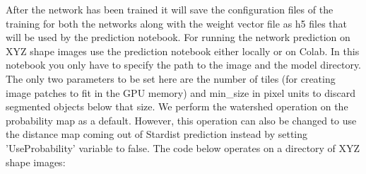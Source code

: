 \documentclass[letterpaper,compsoc,twoside,onecolumn]{IEEEtran}
\begin{document}
After the network has been trained it will save the configuration files of the training for both the networks along with the weight vector file as h5 files that will be used by the prediction notebook. For running the network prediction on XYZ shape images use the prediction notebook either locally or on Colab. In this notebook you only have to specify the path to the image and the model directory. The only two parameters to be set here are the number of tiles (for creating image patches to fit in the GPU memory) and min\_size in pixel units to discard segmented objects below that size. We perform the watershed operation on the probability map as a default. However, this operation can also be changed to use the distance map coming out of Stardist prediction instead by setting 'UseProbability' variable to false.
The code below operates on a directory of XYZ shape images:
\end{document}
